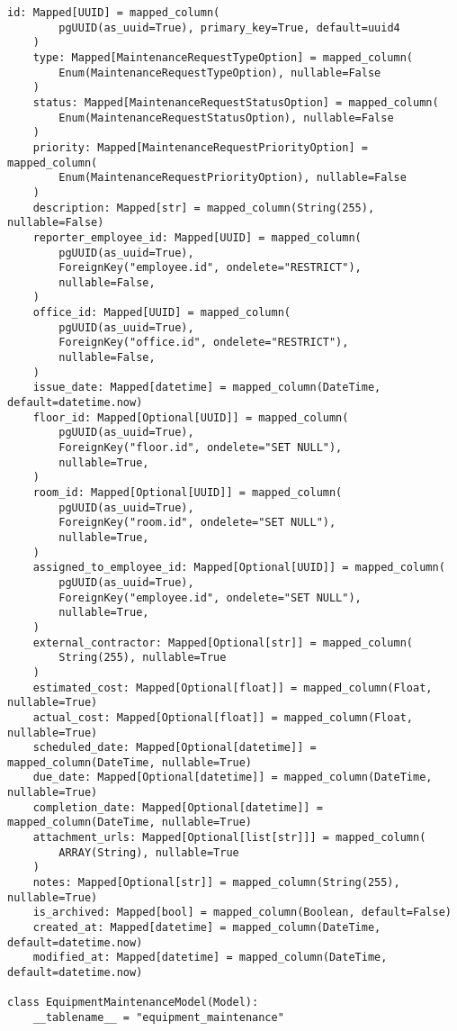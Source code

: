 \begin{lstlisting}[style=pythonstyle]
    id: Mapped[UUID] = mapped_column(
        pgUUID(as_uuid=True), primary_key=True, default=uuid4
    )
    type: Mapped[MaintenanceRequestTypeOption] = mapped_column(
        Enum(MaintenanceRequestTypeOption), nullable=False
    )
    status: Mapped[MaintenanceRequestStatusOption] = mapped_column(
        Enum(MaintenanceRequestStatusOption), nullable=False
    )
    priority: Mapped[MaintenanceRequestPriorityOption] = mapped_column(
        Enum(MaintenanceRequestPriorityOption), nullable=False
    )
    description: Mapped[str] = mapped_column(String(255), nullable=False)
    reporter_employee_id: Mapped[UUID] = mapped_column(
        pgUUID(as_uuid=True),
        ForeignKey("employee.id", ondelete="RESTRICT"),
        nullable=False,
    )
    office_id: Mapped[UUID] = mapped_column(
        pgUUID(as_uuid=True),
        ForeignKey("office.id", ondelete="RESTRICT"),
        nullable=False,
    )
    issue_date: Mapped[datetime] = mapped_column(DateTime, default=datetime.now)
    floor_id: Mapped[Optional[UUID]] = mapped_column(
        pgUUID(as_uuid=True),
        ForeignKey("floor.id", ondelete="SET NULL"),
        nullable=True,
    )
    room_id: Mapped[Optional[UUID]] = mapped_column(
        pgUUID(as_uuid=True),
        ForeignKey("room.id", ondelete="SET NULL"),
        nullable=True,
    )
    assigned_to_employee_id: Mapped[Optional[UUID]] = mapped_column(
        pgUUID(as_uuid=True),
        ForeignKey("employee.id", ondelete="SET NULL"),
        nullable=True,
    )
    external_contractor: Mapped[Optional[str]] = mapped_column(
        String(255), nullable=True
    )
    estimated_cost: Mapped[Optional[float]] = mapped_column(Float, nullable=True)
    actual_cost: Mapped[Optional[float]] = mapped_column(Float, nullable=True)
    scheduled_date: Mapped[Optional[datetime]] = mapped_column(DateTime, nullable=True)
    due_date: Mapped[Optional[datetime]] = mapped_column(DateTime, nullable=True)
    completion_date: Mapped[Optional[datetime]] = mapped_column(DateTime, nullable=True)
    attachment_urls: Mapped[Optional[list[str]]] = mapped_column(
        ARRAY(String), nullable=True
    )
    notes: Mapped[Optional[str]] = mapped_column(String(255), nullable=True)
    is_archived: Mapped[bool] = mapped_column(Boolean, default=False)
    created_at: Mapped[datetime] = mapped_column(DateTime, default=datetime.now)
    modified_at: Mapped[datetime] = mapped_column(DateTime, default=datetime.now)

class EquipmentMaintenanceModel(Model):
    __tablename__ = "equipment_maintenance"


\end{lstlisting}
